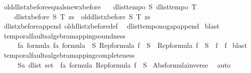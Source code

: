 \begin{isabellebody}
\isanewline
{}\isamarkupfalse%
\ old{\isacharunderscore}dlist{\isacharunderscore}xbefore{\isacharunderscore}equals{\isacharunderscore}new{\isacharunderscore}xbefore{\isacharcolon}\isanewline
\ \ {\isachardoublequoteopen}{\isasymlbrakk}\ dlist{\isacharunderscore}tempo{}\ S{\isacharsemicolon}\ dlist{\isacharunderscore}tempo{}\ T\ {\isasymrbrakk}\ {\isasymLongrightarrow}\ \isanewline
\ \ \ \ dlist{\isacharunderscore}xbefore\ S\ T\ zs\ {\isacharequal}\ old{\isacharunderscore}dlist{\isacharunderscore}xbefore\ S\ T\ zs{\isachardoublequoteclose}\isanewline
%
\isadelimproof
%
\endisadelimproof
%
\isatagproof
{}\isamarkupfalse%
\ dlist{\isacharunderscore}xbefore{\isacharunderscore}append\ old{\isacharunderscore}dlist{\isacharunderscore}xbefore{\isacharunderscore}def\ \isanewline
{}\isamarkupfalse%
\ dlist{\isacharunderscore}tempo{\isacharunderscore}{}{\isacharunderscore}no{\isacharunderscore}gap{\isacharunderscore}append\isanewline
{}\isamarkupfalse%
\ blast%
\endisatagproof
{\isafoldproof}%
%
\isadelimproof
%
\endisadelimproof
%
\isamarkuptrue%
\isamarkupfalse%
\ temporal{\isacharunderscore}faults{\isacharunderscore}algebra{\isacharunderscore}mapping{\isacharunderscore}soundness{\isacharcolon}\ \isanewline
\ \ \ \ {\isachardoublequoteopen}{\isasymforall}\ {\isacharparenleft}fa\ formula{\isacharparenright}\ {\isacharparenleft}fa\ formula{\isacharparenright}{\isachardot}\ {\isasymexists}\ S{\isachardot}\ {\isacharparenleft}{\isacharparenleft}Rep{\isacharunderscore}formula\ f\ {\isacharequal}\ S\ {\isasymand}\ Rep{\isacharunderscore}formula\ f\ {\isacharequal}\ S{\isacharparenright}\ {\isasymlongleftrightarrow}\ f\ {\isacharequal}\ f\isanewline
%
\isadelimproof
%
\endisadelimproof
%
\isatagproof
{}\isamarkupfalse%
\ blast%
\endisatagproof
{\isafoldproof}%
%
\isadelimproof
\isanewline
%
\endisadelimproof
\isanewline
{}\isamarkupfalse%
\ temporal{\isacharunderscore}faults{\isacharunderscore}algebra{\isacharunderscore}mapping{\isacharunderscore}completeness{\isacharcolon}\ \isanewline
\ \ \ \ {\isachardoublequoteopen}{\isasymforall}\ {\isacharparenleft}S{\isacharcolon}{\isacharcolon}{\isacharprime}a\ dlist\ set{\isacharparenright}{\isachardot}\ {\isasymexists}\ f{\isacharcolon}{\isacharcolon}{\isacharprime}a\ formula{\isachardot}\ Rep{\isacharunderscore}formula\ f\ {\isacharequal}\ S{\isachardoublequoteclose}\isanewline
%
\isadelimproof
%
\endisadelimproof
%
\isatagproof
{}\isamarkupfalse%
\ Abs{\isacharunderscore}formula{\isacharunderscore}inverse\ \isamarkupfalse%
\ auto\isanewline
\isanewline
%
\endisatagproof
{\isafoldproof}%
%
\isadelimproof
%
\endisadelimproof
%
\isadelimtheory
%
\endisadelimtheory
%
\isatagtheory
%
\endisatagtheory
{\isafoldtheory}%
%
\isadelimtheory
%
\endisadelimtheory
%
\end{isabellebody}%
